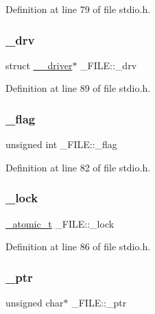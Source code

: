 Definition at line 79 of file stdio.\+h.

\mbox{\label{struct__FILE_a45e9603683edd1760f891ab11c2f9d3f}} 
\subsubsection{\texorpdfstring{\_drv}{\_drv}}
{\footnotesize\ttfamily struct \mbox{\hyperlink{struct____driver}{\+\_\+\+\_\+driver}}$\ast$ \+\_\+\+F\+I\+L\+E\+::\+\_\+drv}



Definition at line 89 of file stdio.\+h.

\mbox{\label{struct__FILE_a571db8b3c19efbcea436c6db6f6c963f}} 
\subsubsection{\texorpdfstring{\_flag}{\_flag}}
{\footnotesize\ttfamily unsigned int \+\_\+\+F\+I\+L\+E\+::\+\_\+flag}



Definition at line 82 of file stdio.\+h.

\mbox{\label{struct__FILE_a423c5224e09d8aac0b1d3b96a945df10}} 
\subsubsection{\texorpdfstring{\_lock}{\_lock}}
{\footnotesize\ttfamily \mbox{\hyperlink{thread_8h_a6743820c6e04c49e472e7cbeded2f83f}{\+\_\+atomic\+\_\+t}} \+\_\+\+F\+I\+L\+E\+::\+\_\+lock}



Definition at line 86 of file stdio.\+h.

\mbox{\label{struct__FILE_a520588e16163f7573f4f2bcd6e73e531}} 
\subsubsection{\texorpdfstring{\_ptr}{\_ptr}}
{\footnotesize\ttfamily unsigned char$\ast$ \+\_\+\+F\+I\+L\+E\+::\+\_\+ptr}



